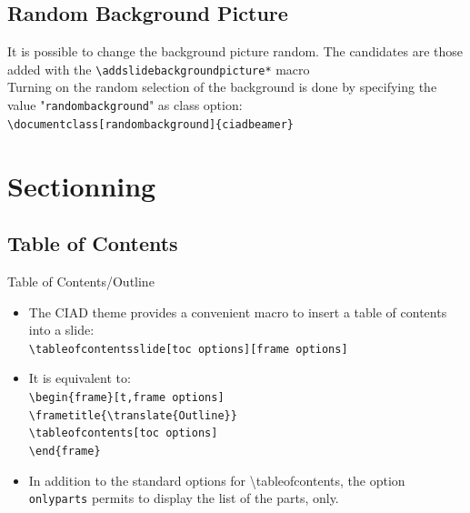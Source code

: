 \documentclass[english,sectioncirclenumberstyle]{ciadbeamer}
\begin{document}
\subsection{Random Background Picture}

\begin{frame}{\subsecname}
	It is possible to change the background picture random. The candidates are those added with the \texttt{{\textbackslash}addslidebackgroundpicture*} macro \\[.25cm]
	Turning on the random selection of the background is done by specifying the value "\texttt{randombackground}" as class option: \\[.25cm]
	\texttt{{\textbackslash}documentclass[randombackground]\{ciadbeamer\}}
\end{frame}



\section{Sectionning}
\tableofcontentslide[sectionstyle={show/shaded},subsectionstyle={show/show/hide},subsubsectionstyle={hide/hide/hide/hide},sections={1-6}]

\subsection{Table of Contents}

\begin{frame}{Table of Contents/Outline}
	\begin{itemize}
	\item The CIAD theme provides a convenient macro to insert a table of contents into a slide: \\
		\texttt{{\textbackslash}tableofcontentsslide[toc options][frame options]}
	\vspace{1em}
	\item It is equivalent to: \\
		\texttt{{\textbackslash}begin\{frame\}[t,frame options]} \\
		\texttt{{\textbackslash}frametitle\{{\textbackslash}translate\{Outline\}\}} \\
		\texttt{{\textbackslash}tableofcontents[toc options]} \\
		\texttt{{\textbackslash}end\{frame\}}
	\vspace{1em}
	\item In addition to the standard options for {{\textbackslash}tableofcontents}, the option \texttt{onlyparts} permits to display the list of the parts, only.
	\end{itemize}
\end{frame}
\end{document}
